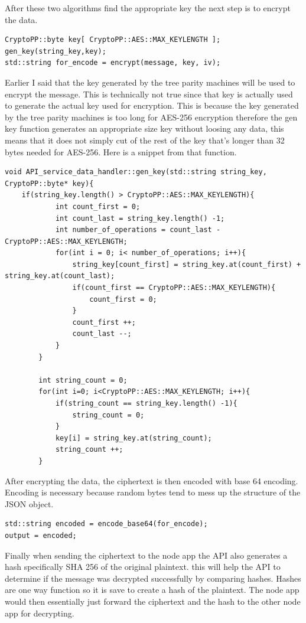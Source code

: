 After these two algorithms find the appropriate key the next step is to encrypt the data.
\begin{lstlisting}
CryptoPP::byte key[ CryptoPP::AES::MAX_KEYLENGTH ];
gen_key(string_key,key);
std::string for_encode = encrypt(message, key, iv);
\end{lstlisting} 
Earlier I said that the key generated by the tree parity machines will be used to encrypt the message. This is technically not true since that key is actually used to generate the actual key used for encryption. This is because the key generated by the tree parity machines is too long for AES-256 encryption therefore the gen key function generates an appropriate size key without loosing any data, this means that it does not simply cut of the rest of the key that's longer than 32 bytes needed for AES-256. Here is a snippet from that function.
\begin{lstlisting}
void API_service_data_handler::gen_key(std::string string_key, CryptoPP::byte* key){
    if(string_key.length() > CryptoPP::AES::MAX_KEYLENGTH){
            int count_first = 0;
            int count_last = string_key.length() -1;
            int number_of_operations = count_last - CryptoPP::AES::MAX_KEYLENGTH;
            for(int i = 0; i< number_of_operations; i++){
                string_key[count_first] = string_key.at(count_first) + string_key.at(count_last);
                if(count_first == CryptoPP::AES::MAX_KEYLENGTH){
                    count_first = 0;
                }
                count_first ++;
                count_last --;
            }
        }
        
        int string_count = 0;
        for(int i=0; i<CryptoPP::AES::MAX_KEYLENGTH; i++){
            if(string_count == string_key.length() -1){
                string_count = 0;
            }
            key[i] = string_key.at(string_count);
            string_count ++;
        } 
\end{lstlisting} 

After encrypting the data, the ciphertext is then encoded with base 64 encoding. Encoding is necessary because random bytes tend to mess up the structure of the JSON object.
\begin{lstlisting}
std::string encoded = encode_base64(for_encode);
output = encoded;
\end{lstlisting} 

Finally when sending the ciphertext to the node app the API also generates a hash specifically SHA 256 of the original plaintext. this will help the API to determine if the message was decrypted successfully by comparing hashes. Hashes are one way function so it is save to create a hash of the plaintext. The node app would then essentially just forward the ciphertext and the hash to the other node app for decrypting.

